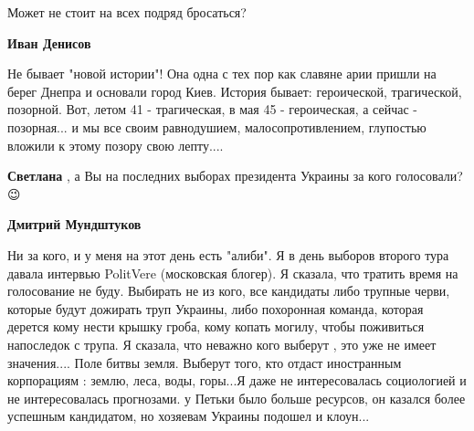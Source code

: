 \begin{itemize}
\begin{itemize}
Может не стоит на всех подряд бросаться?

 
\textbf{Иван Денисов} 

Не бывает "новой истории"! Она одна с тех пор как славяне
арии пришли на берег Днепра и основали город Киев. История бывает: героической,
трагической, позорной. Вот, летом 41 - трагическая, в мая 45 - героическая, а
сейчас - позорная... и мы все своим равнодушием, малосопротивлением, глупостью
вложили к этому позору свою лепту....

 
\textbf{Светлана} , а Вы на последних выборах президента Украины за кого голосовали? 😉

 
\textbf{Дмитрий Мундштуков} 

Ни за кого, и у меня на этот день есть "алиби". Я в
день выборов второго тура давала интервью PolitVere (московская блогер). Я
сказала, что тратить время на голосование не буду. Выбирать не из кого, все
кандидаты либо трупные черви, которые будут дожирать труп Украины, либо
похоронная команда, которая дерется кому нести крышку гроба, кому копать
могилу, чтобы поживиться напоследок с трупа. Я сказала, что неважно кого
выберут , это уже не имеет значения.... Поле битвы земля. Выберут того, кто
отдаст иностранным корпорациям : землю, леса, воды, горы...Я даже не
интересовалась социологией и не интересовалась прогнозами. у Петьки было больше
ресурсов, он казался более успешным кандидатом, но хозяевам Украины подошел и
клоун...

\end{itemize}

 


\end{itemize}
